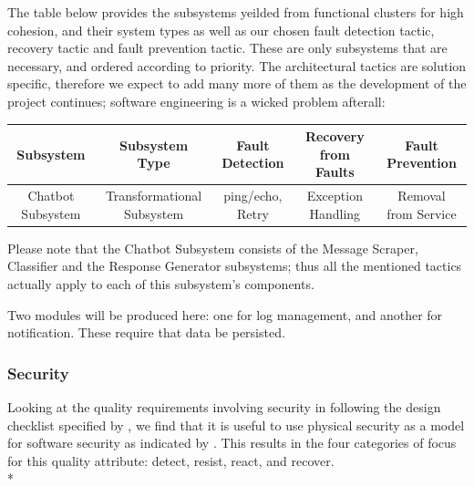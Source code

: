 \documentclass[11pt]{article}
\begin{document}
The table below provides the subsystems yeilded from functional clusters for high cohesion, and their system types as well as our chosen fault detection tactic, recovery tactic and fault prevention tactic. These are only subsystems that are necessary, and ordered according to priority. The architectural tactics are solution specific, therefore we expect to add many more of them as the development of the project continues; software engineering is a wicked problem afterall:

\begin{center}
	\hspace*{-1.2cm}\begin{tabular}{|c|c|c|c|c|}
		\hline
		Subsystem & Subsystem Type & Fault Detection & Recovery from Faults & Fault Prevention \\
		\hline
		Chatbot Subsystem & Transformational Subsystem & ping/echo, Retry & Exception Handling & Removal from Service\\
		\hline
	\end{tabular}	
\end{center}
Please note that the Chatbot Subsystem consists of the Message Scraper, Classifier and the Response Generator subsystems; thus all the mentioned tactics actually apply to each of this subsystem's components.

Two modules will be produced here: one for log management, and another for notification. These require that data be persisted.

\subsubsection{Security}
Looking at the quality requirements involving security in following the design checklist specified by \cite{Book:1}, we find that it is useful to use physical security as a model for software security as indicated by \cite{Book:2}. This results in the four categories of focus for this quality attribute: detect, resist, react, and recover. \\*
\end{document}
